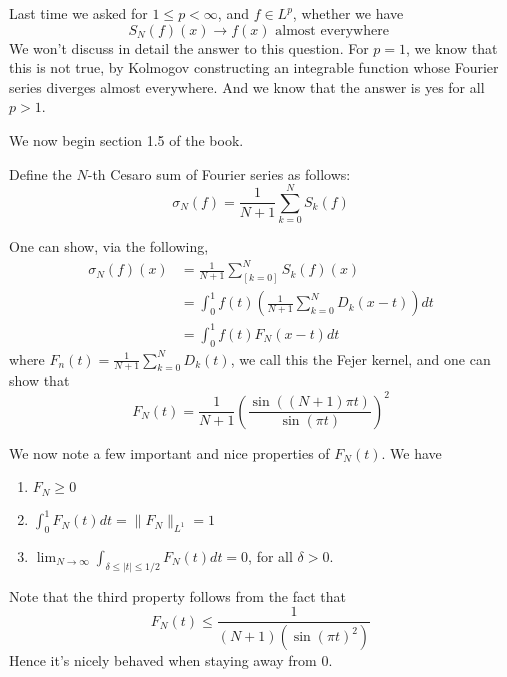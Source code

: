 Last time we asked for $1\leq p<\infty$, and $f\in L^p$, whether we have
\begin{equation*}
    S_N(f)(x)\to f(x) \text{ almost everywhere }
\end{equation*}
We won't discuss in detail the answer to this question. For $p=1$, we know that this is not true, by Kolmogov constructing an integrable function whose Fourier series diverges almost everywhere. And we know that the answer is yes for all $p>1$.

We now begin section 1.5 of the book.
\begin{definition}
    Define the $N$-th Cesaro sum of Fourier series as follows:
    \begin{equation*}
        \sigma_N(f)=\frac{1}{N+1}\sum_{k=0}^NS_k(f)
    \end{equation*}
\end{definition}
One can show, via the following,
\begin{align*}
    \sigma_N(f)(x)&=\frac{1}{N+1}\sum_[k=0]^NS_k(f)(x)\\
    &=\int_0^1f(t)\left(\frac{1}{N+1}\sum_{k=0}^ND_k(x-t) \right)dt\\
    &=\int_0^1f(t)F_N(x-t)dt
\end{align*}
where $F_n(t)=\frac{1}{N+1}\sum_{k=0}^ND_k(t)$, we call this the Fejer kernel, and one can show that 
\begin{equation*}
    F_N(t)=\frac{1}{N+1}\left(\frac{\sin((N+1)\pi t)}{\sin(\pi t)} \right)^2
\end{equation*}

We now note a few important and nice properties of $F_N(t)$. We have
\begin{enumerate}
    \item $F_N\geq 0$
    \item $\int_0^1 F_N(t)dt=\|F_N\|_{L^1}=1$
    \item $\lim_{N\to\infty}\int_{\delta\leq|t|\leq 1/2}F_N(t)dt=0$, for all $\delta>0$.
\end{enumerate}
Note that the third property follows from the fact that
\begin{equation*}
    F_N(t)\leq\frac{1}{(N+1)(\sin(\pi t)^2)}
\end{equation*}
Hence it's nicely behaved when staying away from 0.

